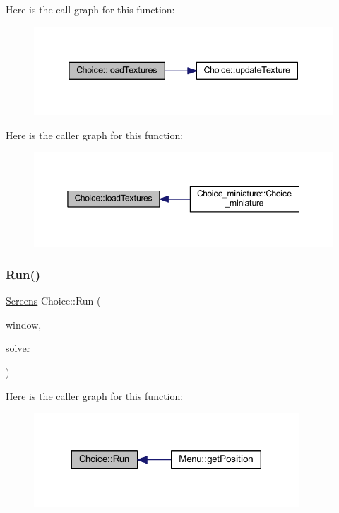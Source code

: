 Here is the call graph for this function\+:
\nopagebreak
\begin{figure}[H]
\begin{center}
\leavevmode
\includegraphics[width=338pt]{class_choice_a70d994feb4c3215eb477bae3df7c5052_cgraph}
\end{center}
\end{figure}
Here is the caller graph for this function\+:
\nopagebreak
\begin{figure}[H]
\begin{center}
\leavevmode
\includegraphics[width=350pt]{class_choice_a70d994feb4c3215eb477bae3df7c5052_icgraph}
\end{center}
\end{figure}
\mbox{\label{class_choice_a4b8be200875261610f5a638a6e26ccf2}} 
\subsubsection{\texorpdfstring{Run()}{Run()}}
{\footnotesize\ttfamily \hyperlink{_globals_8h_a3d5776bab98402b03be09156bacf4f68}{Screens} Choice\+::\+Run (\begin{DoxyParamCaption}\item[{sf\+::\+Render\+Target \&}]{window,  }\item[{\hyperlink{class_go___solver}{Go\+\_\+\+Solver} \&}]{solver }\end{DoxyParamCaption})}

Here is the caller graph for this function\+:
\nopagebreak
\begin{figure}[H]
\begin{center}
\leavevmode
\includegraphics[width=281pt]{class_choice_a4b8be200875261610f5a638a6e26ccf2_icgraph}
\end{center}
\end{figure}
\mbox{\label{class_choice_a377e5d456c5c7c7e8914af52cf184a3a}} 
